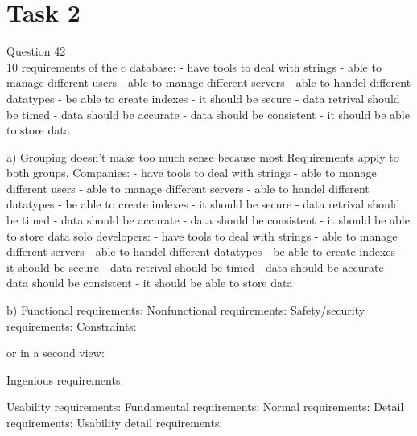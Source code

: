 \chapter{Task 2}
Question 42 \\
10 requirements of the c database:
- have tools to deal with strings
- able to manage different users
- able to manage different servers
- able to handel different datatypes
- be able to create indexes
- it should be secure
- data retrival should be timed
- data should be accurate
- data should be consistent
- it should be able to store data

a)
Grouping doesn't make too much sense because most Requirements apply to both groups.
Companies:
- have tools to deal with strings
- able to manage different users
- able to manage different servers
- able to handel different datatypes
- be able to create indexes
- it should be secure
- data retrival should be timed
- data should be accurate
- data should be consistent
- it should be able to store data
solo developers:
- have tools to deal with strings
- able to manage different servers
- able to handel different datatypes
- be able to create indexes
- it should be secure
- data retrival should be timed
- data should be accurate
- data should be consistent
- it should be able to store data

b)
Functional requirements:
Nonfunctional requirements:
Safety/security requirements:
Constraints:

or in a second view:

Ingenious requirements:

Usability requirements:
Fundamental requirements:
 Normal requirements:
 Detail requirements:
 Usability detail requirements:

